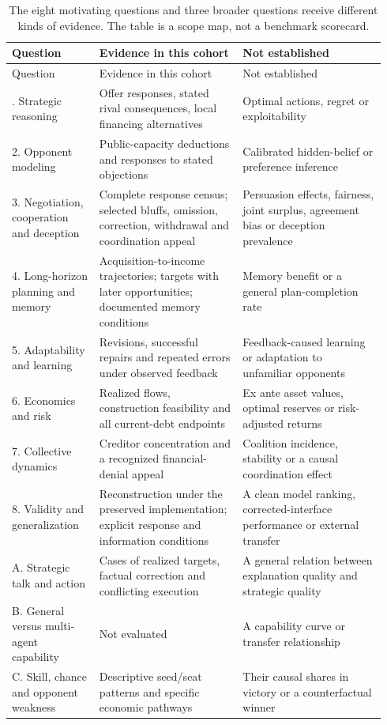 \begingroup\footnotesize
\renewcommand{\arraystretch}{1.09}
\begin{longtable}{@{}L{0.22\linewidth}L{0.36\linewidth}L{0.36\linewidth}@{}}
\caption{The eight motivating questions and three broader questions receive different kinds of evidence. The table is a scope map, not a benchmark scorecard.}\label{tab:questions}\\
\toprule
Question & Evidence in this cohort & Not established\\
\midrule\endfirsthead
\toprule
Question & Evidence in this cohort & Not established\\
\midrule\endhead
\bottomrule{}. Strategic reasoning & Offer responses, stated rival consequences, local financing alternatives & Optimal actions, regret or exploitability\\
2. Opponent modeling & Public-capacity deductions and responses to stated objections & Calibrated hidden-belief or preference inference\\
3. Negotiation, cooperation and deception & Complete response census; selected bluffs, omission, correction, withdrawal and coordination appeal & Persuasion effects, fairness, joint surplus, agreement bias or deception prevalence\\
4. Long-horizon planning and memory & Acquisition-to-income trajectories; targets with later opportunities; documented memory conditions & Memory benefit or a general plan-completion rate\\
5. Adaptability and learning & Revisions, successful repairs and repeated errors under observed feedback & Feedback-caused learning or adaptation to unfamiliar opponents\\
6. Economics and risk & Realized flows, construction feasibility and all current-debt endpoints & Ex ante asset values, optimal reserves or risk-adjusted returns\\
7. Collective dynamics & Creditor concentration and a recognized financial-denial appeal & Coalition incidence, stability or a causal coordination effect\\
8. Validity and generalization & Reconstruction under the preserved implementation; explicit response and information conditions & A clean model ranking, corrected-interface performance or external transfer\\
\midrule
A. Strategic talk and action & Cases of realized targets, factual correction and conflicting execution & A general relation between explanation quality and strategic quality\\
B. General versus multi-agent capability & Not evaluated & A capability curve or transfer relationship\\
C. Skill, chance and opponent weakness & Descriptive seed/seat patterns and specific economic pathways & Their causal shares in victory or a counterfactual winner\\
\end{longtable}
\endgroup

